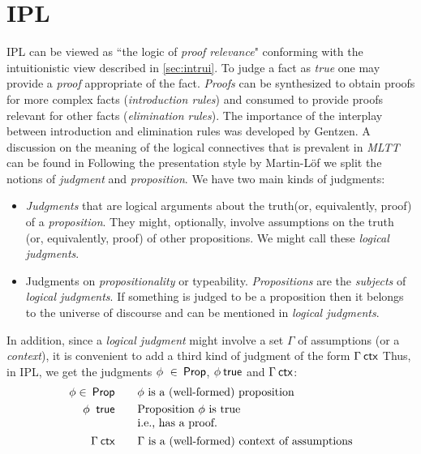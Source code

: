 \section{IPL}
\ac{IPL} can be viewed as ``the logic of \emph{proof relevance}" conforming with the intuitionistic view described in \ref{sec:intrui}. To judge a fact as \emph{true} one may provide a \emph{proof}
appropriate of the fact. \emph{Proofs} can be synthesized to obtain proofs for more complex facts (\emph{introduction rules}) and consumed to provide proofs relevant for other  facts (\emph{elimination rules}). The importance of the interplay between introduction and elimination rules was developed by Gentzen. A discussion on the meaning of the logical connectives that is prevalent in \emph{MLTT} can be found in \cite{martin1996meanings} 
Following the presentation style  by   Martin-L\"{o}f we split the notions of \emph{judgment} and \emph{proposition}. We have two main kinds of judgments:
\begin{itemize}
\item  \emph{Judgments} that are logical arguments about the truth(or, equivalently, proof) of a \emph{proposition}. They might, optionally, involve assumptions on the truth (or, equivalently, proof) of other propositions. We might call these \emph{logical judgments}. 

\item Judgments on \emph{propositionality} or typeability. \emph{Propositions} are the \emph{subjects}  of \emph{logical judgments}. If something is judged to be a proposition then it belongs to the universe of discourse and can be mentioned in \emph{logical judgments}. 
\end{itemize} 
In addition, since a \emph{logical judgment} might involve a set $\Gamma$ of assumptions (or a \emph{context}), it is convenient to add a third kind of judgment of the form $\Gamma \context$ 
Thus, in \ac{IPL}, we get the judgments $\phi\ \in \prop$, $\phi \true$ and $\Gamma \context$:
\begin{alignat*}{2}
  \phi \in \prop &&\quad& \text{$
  \phi$ is a (well-formed) proposition} \\
  \phi\  \true &&& \text{\begin{tabular}[t]{@{}l@{}}
                Proposition $\phi$ is true \\
                i.e., has a proof.
              \end{tabular}}\\
  \Gamma \context &&\quad& \text{$\Gamma$ is a (well-formed) context of assumptions} \\
\end{alignat*}

